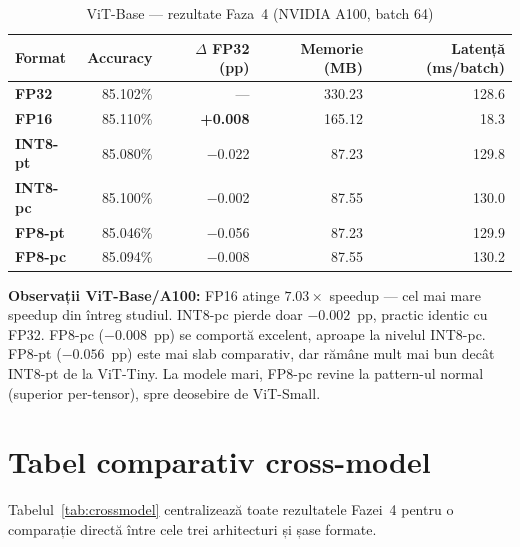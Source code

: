 \documentclass[12pt,a4paper]{article}
\newcommand{\dpos}[1]{\textcolor{posgreen}{\textbf{#1}}}
\newcommand{\dneg}[1]{\textcolor{negred}{#1}}
\begin{document}
\begin{table}[H]
  \centering
  \caption{ViT-Base — rezultate Faza~4 (NVIDIA A100, batch 64)}
  \begin{tabular}{lrrrr}
    \toprule
    \textbf{Format} & \textbf{Accuracy} & \textbf{$\Delta$ FP32 (pp)} &
    \textbf{Memorie (MB)} & \textbf{Latență (ms/batch)} \\
    \midrule
    \textcolor{fp32color}{\textbf{FP32}}    & 85.102\% & ---                  & 330.23 & 128.6 \\
    \textcolor{fp16color}{\textbf{FP16}}    & 85.110\% & \dpos{+0.008}        & 165.12 & \phantom{0}18.3 \\
    \textcolor{int8ptcolor}{\textbf{INT8-pt}} & 85.080\% & \dneg{$-$0.022}   & \phantom{0}87.23 & 129.8 \\
    \textcolor{int8pccolor}{\textbf{INT8-pc}} & 85.100\% & \dneg{$-$0.002}   & \phantom{0}87.55 & 130.0 \\
    \textcolor{fp8ptcolor}{\textbf{FP8-pt}}   & 85.046\% & \dneg{$-$0.056}  & \phantom{0}87.23 & 129.9 \\
    \textcolor{fp8pccolor}{\textbf{FP8-pc}}   & 85.094\% & \dneg{$-$0.008}  & \phantom{0}87.55 & 130.2 \\
    \bottomrule
  \end{tabular}
  \label{tab:base}
\end{table}

\textbf{Observații ViT-Base/A100:}
FP16 atinge $\mathbf{7.03\times}$ speedup --- cel mai mare speedup din
întreg studiul. INT8-pc pierde doar $-0.002$~pp, practic identic cu FP32.
FP8-pc ($-0.008$~pp) se comportă excelent, aproape la nivelul INT8-pc.
FP8-pt ($-0.056$~pp) este mai slab comparativ, dar rămâne mult mai bun
decât INT8-pt de la ViT-Tiny. La modele mari, FP8-pc revine la pattern-ul
normal (superior per-tensor), spre deosebire de ViT-Small.

\section{Tabel comparativ cross-model}

Tabelul~\ref{tab:crossmodel} centralizează toate rezultatele Fazei~4
pentru o comparație directă între cele trei arhitecturi și șase formate.
\end{document}

